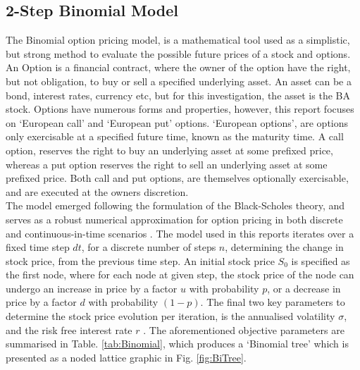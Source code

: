\documentclass[
	a4paper, %
	11pt, %
	twoside, %
]{LTJournalArticle}
\begin{document}
\subsection{2-Step Binomial Model}
\label{sec:Bi_model}
The Binomial option pricing model, is a mathematical tool used as a simplistic, but strong method to evaluate the possible future prices of a stock and options.
An Option is a financial contract, where the owner of the option have the right, but not obligation, to buy or sell a specified underlying asset.
An asset can be a bond, interest rates, currency etc, but for this investigation, the asset is the BA stock.
Options have numerous forms and properties, however, this report focuses on `European call' and `European put' options.
`European options', are options only exercisable at a specified future time, known as the maturity time.
A call option, reserves the right to buy an underlying asset at some prefixed price, whereas a put option reserves the right to sell an underlying asset at some prefixed price.
Both call and put options, are themselves optionally exercisable, and are executed at the owners discretion.
\\
\indent The model emerged following the formulation of the Black-Scholes theory, and serves as a robust numerical approximation for option pricing in both discrete and continuous-in-time scenarios \cite{Korn_2010}.
The model used in this reports iterates over a fixed time step $dt$, for a discrete number of steps $n$, determining the change in stock price, from the previous time step.
An initial stock price $S_{0}$ is specified as the first node, where for each node at given step, the stock price of the node can undergo an increase in price by a factor $u$ with probability $p$, or a decrease in price by a factor $d$ with probability $(1-p)$.
The final two key parameters to determine the stock price evolution per iteration, is the annualised volatility $\sigma$, and the risk free interest rate $r$ \cite{Rendelman_1979}.
The aforementioned objective parameters are summarised in Table. \ref{tab:Binomial}, which produces a `Binomial tree' which is presented as a noded lattice graphic in Fig. \ref{fig:BiTree}.
\end{document}
